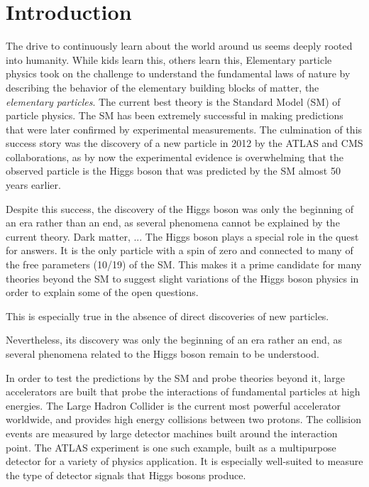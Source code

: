 \chapter{Introduction}
\label{chap:introduction}

The drive to continuously learn about the world around us seems deeply rooted into humanity.
While kids learn this, others learn this, 
Elementary particle physics took on the challenge to understand the fundamental laws of nature by describing the behavior of the elementary building blocks of matter, the \emph{elementary particles}. 
The current best theory is the Standard Model (SM) of particle physics. The SM has been extremely successful in making predictions that were later confirmed by experimental measurements. The culmination of this success story was the discovery of a new particle in 2012 by the ATLAS and CMS collaborations, as by now the experimental evidence is overwhelming that the observed particle is the Higgs boson that was predicted by the SM almost 50 years earlier. 

Despite this success, the discovery of the Higgs boson was only the beginning of an era rather than an end, as several phenomena cannot be explained by the current theory. 
Dark matter, ...
The Higgs boson plays a special role in the quest for answers. 
It is the only particle with a spin of zero and connected to many of the free parameters (10/19) of the SM. 
This makes it a prime candidate for many theories beyond the SM to suggest slight variations of the Higgs boson physics in order to explain some of the open questions. 

This is especially true in the absence of direct discoveries of new particles. 

Nevertheless, its discovery was only the beginning of an era rather an end, as several phenomena related to the Higgs boson remain to be understood. 

In order to test the predictions by the SM and probe theories beyond it, large accelerators are built that probe the interactions of fundamental particles at high energies. The Large Hadron Collider is the current most powerful accelerator worldwide, and provides high energy collisions between two protons. 
The collision events are measured by large detector machines built around the interaction point. The ATLAS experiment is one such example, built as a multipurpose detector for a variety of physics application. It is especially well-suited to measure the type of detector signals that Higgs bosons produce. 

